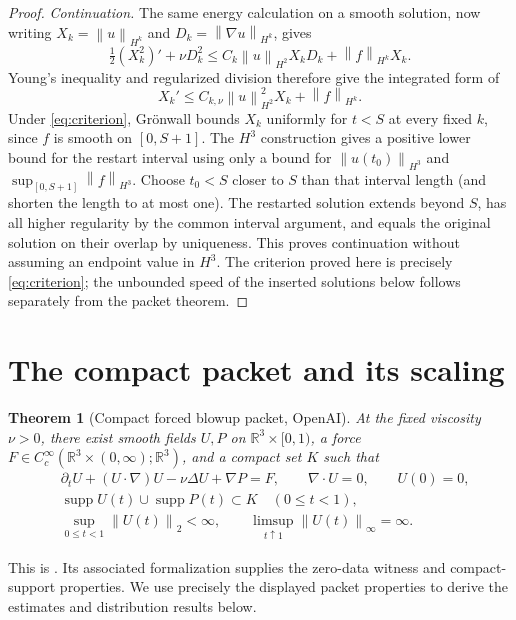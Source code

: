 \documentclass[11pt,a4paper]{article}
\newtheorem{theorem}{Theorem}[section]
\theoremstyle{definition}\newtheorem{definition}[theorem]{Definition}
\theoremstyle{remark}\newtheorem{remark}[theorem]{Remark}
\newcommand{\R}{\mathbb R}\newcommand{\TT}{\mathbb T^3}
\newcommand{\norm}[1]{\left\lVert#1\right\rVert}
\DeclareMathOperator{\supp}{supp}
\begin{document}
\begin{proof}
\emph{Continuation.}
The same energy calculation on a smooth solution, now writing
$X_k=\norm{u}_{H^k}$ and $D_k=\norm{\nabla u}_{H^k}$, gives
\[
 \tfrac12(X_k^2)'+\nu D_k^2
 \le C_k\norm{u}_{H^2}X_kD_k+\norm{f}_{H^k}X_k.
\]
Young's inequality and regularized division therefore give the integrated
form of
\begin{equation}\label{eq:highcontinuation}
 X_k'\le C_{k,\nu}\norm{u}_{H^2}^2X_k+\norm{f}_{H^k}.
\end{equation}
Under \eqref{eq:criterion}, Gr\"onwall bounds $X_k$ uniformly for $t<S$ at
every fixed $k$, since $f$ is smooth on $[0,S+1]$.
The $H^3$ construction gives a positive lower bound for the restart interval
using only a bound for $\norm{u(t_0)}_{H^3}$ and
$\sup_{[0,S+1]}\norm{f}_{H^3}$. Choose $t_0<S$ closer to $S$ than that
interval length (and shorten the length to at most one). The restarted
solution extends beyond $S$, has all higher regularity by the common
interval argument, and equals the original solution on their overlap by
uniqueness. This proves continuation without assuming an endpoint value
in $H^3$. The criterion proved here is precisely \eqref{eq:criterion};
the unbounded speed of the inserted solutions below follows separately
from the packet theorem.
\end{proof}

\section{The compact packet and its scaling}\label{sec:packet}
\begin{theorem}[Compact forced blowup packet, OpenAI]\label{thm:packet}
At the fixed viscosity $\nu>0$, there exist smooth fields $U,P$ on
$\R^3\times[0,1)$, a force
$F\in C_c^\infty(\R^3\times(0,\infty);\R^3)$, and a compact set $K$ such that
\begin{align}
 &\partial_tU+(U\cdot\nabla)U-\nu\Delta U+\nabla P=F,\qquad
 \nabla\cdot U=0,\qquad U(0)=0,\label{eq:packet}\\
 &\supp U(t)\cup\supp P(t)\subset K\quad(0\le t<1),\nonumber\\
 &\sup_{0\le t<1}\norm{U(t)}_2<\infty,\qquad
 \limsup_{t\uparrow1}\norm{U(t)}_\infty=\infty.\label{eq:packetblowup}
\end{align}
\end{theorem}
This is \cite[Theorem 1.1]{openai}. Its associated formalization \cite{lean} supplies the zero-data witness and compact-support properties. We use precisely the displayed packet properties to derive the estimates and distribution results below.
\end{document}
